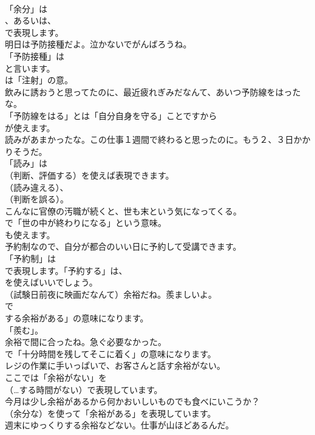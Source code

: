\documentclass[8pt]{extreport}
\begin{document}
\begin{CJK}{UTF8}{min}
\\	「余分」は
\\	、あるいは、
\\	で表現します。
\\	明日は予防接種だよ。泣かないでがんばろうね。 
\\	「予防接種」は
\\	と言います。
\\	は「注射」の意。	
\\	飲みに誘おうと思ってたのに、最近疲れぎみだなんて、あいつ予防線をはったな。 
\\	「予防線をはる」とは「自分自身を守る」ことですから
\\	が使えます。	
\\	読みがあまかったな。この仕事１週間で終わると思ったのに。もう２、３日かかりそうだ。 
\\	「読み」は
\\	（判断、評価する）を使えば表現できます。
\\	（読み違える）、
\\	（判断を誤る）。	
\\	こんなに官僚の汚職が続くと、世も末という気になってくる。 
\\	で「世の中が終わりになる」という意味。
\\	も使えます。	
\\	予約制なので、自分が都合のいい日に予約して受講できます。 
\\	「予約制」は
\\	で表現します。「予約する」は、
\\	を使えばいいでしょう。	
\\	（試験日前夜に映画だなんて）余裕だね。羨ましいよ。 
\\	で
\\	する余裕がある」の意味になります。
\\	「羨む」。	
\\	余裕で間に合ったね。急ぐ必要なかった。 
\\	で「十分時間を残してそこに着く」の意味になります。	
\\	レジの作業に手いっぱいで、お客さんと話す余裕がない。 
\\	ここでは「余裕がない」を 
\\	（…する時間がない）で表現しています。	
\\	今月は少し余裕があるから何かおいしいものでも食べにいこうか？ 
\\	（余分な）を使って「余裕がある」を表現しています。	
\\	週末にゆっくりする余裕などない。仕事が山ほどあるんだ。 

\end{CJK}
\end{document}
